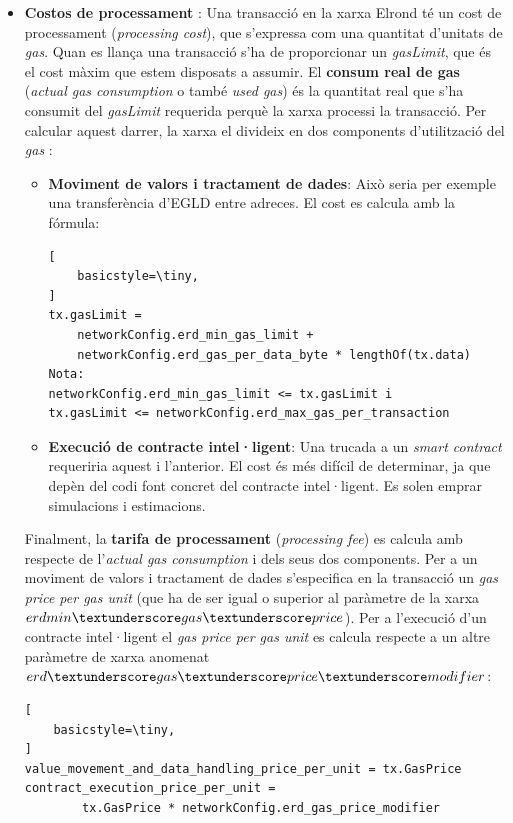 \documentclass[11pt,a4paper]{article}
\begin{document}
\begin{itemize}
\item \textbf{Costos de processament} \cite{elrond2022}:
Una transacció en la xarxa Elrond té un cost de processament (\textit{processing cost}), que s'expressa com una quantitat d'unitats de \textit{gas}. Quan es llança una transacció s'ha de proporcionar un \textit{gasLimit}, que és el cost màxim que estem disposats a assumir. El \textbf{consum real de gas} (\textit{actual gas consumption} o també \textit{used gas}) és la quantitat real que s'ha consumit del \textit{gasLimit} requerida perquè la xarxa processi la transacció. Per calcular aquest darrer, la xarxa el divideix en dos components d'utilització del \textit{gas} \cite{elrond2022}:
\begin{itemize}
\item \textbf{Moviment de valors i tractament de dades}: Això seria per exemple una transferència d'EGLD entre adreces. El cost es calcula amb la fórmula:
\begin{lstlisting}[
    basicstyle=\tiny,
]
tx.gasLimit = 
    networkConfig.erd_min_gas_limit + 
    networkConfig.erd_gas_per_data_byte * lengthOf(tx.data)
Nota:
networkConfig.erd_min_gas_limit <= tx.gasLimit i
tx.gasLimit <= networkConfig.erd_max_gas_per_transaction
\end{lstlisting}
\item \textbf{Execució de contracte intel·ligent}: Una trucada a un \textit{smart contract} requeriria aquest i l'anterior. El cost és més difícil de determinar, ja que depèn del codi font concret del contracte intel·ligent. Es solen emprar simulacions i estimacions.
\end{itemize}
Finalment, la \textbf{tarifa de processament} (\textit{processing fee}) es calcula amb respecte de l'\textit{actual gas consumption} i dels seus dos components. Per a un moviment de valors i tractament de dades s'especifica en la transacció un \textit{gas price per gas unit} (que ha de ser igual o superior al paràmetre de la xarxa \(erdmin\textunderscore  gas\textunderscore price\)). Per a l'execució d'un contracte intel·ligent el \textit{gas price per gas unit} es calcula respecte a un altre paràmetre de xarxa anomenat \(erd\textunderscore gas\textunderscore price\textunderscore modifier\):
\begin{lstlisting}[
    basicstyle=\tiny,
]
value_movement_and_data_handling_price_per_unit = tx.GasPrice
contract_execution_price_per_unit =
		tx.GasPrice * networkConfig.erd_gas_price_modifier
\end{lstlisting}


\end{itemize}
\end{document}
